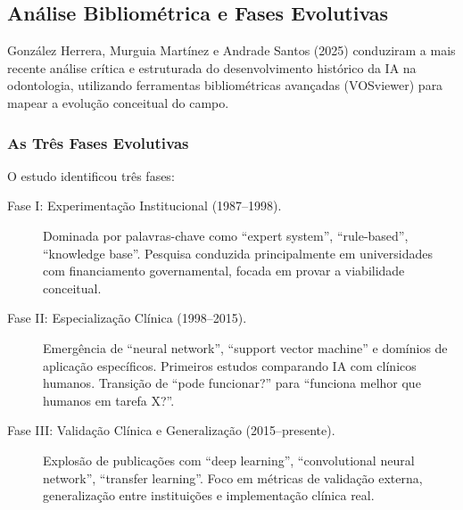 \subsection{Análise Bibliométrica e Fases Evolutivas}

González Herrera, Murguia Martínez e Andrade Santos (2025) \cite{ODT-005} conduziram a mais recente análise crítica e estruturada do desenvolvimento histórico da IA na odontologia, utilizando ferramentas bibliométricas avançadas (VOSviewer) para mapear a evolução conceitual do campo.


\subsubsection{As Três Fases Evolutivas}

O estudo identificou três fases:

\begin{description}
    \item[Fase I: Experimentação Institucional (1987--1998).] Dominada por palavras-chave como ``expert system'', ``rule-based'', ``knowledge base''. Pesquisa conduzida principalmente em universidades com financiamento governamental, focada em provar a viabilidade conceitual.
    \item[Fase II: Especialização Clínica (1998--2015).] Emergência de ``neural network'', ``support vector machine'' e domínios de aplicação específicos. Primeiros estudos comparando IA com clínicos humanos. Transição de ``pode funcionar?'' para ``funciona melhor que humanos em tarefa X?''.
    \item[Fase III: Validação Clínica e Generalização (2015--presente).] Explosão de publicações com ``deep learning'', ``convolutional neural network'', ``transfer learning''. Foco em métricas de validação externa, generalização entre instituições e implementação clínica real.
\end{description}

